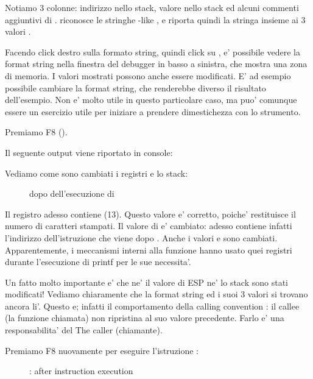 Notiamo 3 colonne: indirizzo nello stack, valore nello stack ed alcuni commenti aggiuntivi di \olly. 
\olly riconosce le stringhe \printf{}-like , e riporta quindi la stringa insieme ai 3 valori .

Facendo click destro sulla formato string, quindi click su ,
e' possibile vedere la format string nella finestra del debugger in basso a sinistra, che mostra una zona di memoria.
I valori mostrati possono anche essere modificati.
E' ad esempio possibile cambiare la format string, che renderebbe diverso il risultato dell'esempio.
Non e' molto utile in questo particolare caso, ma puo' comunque essere un esercizio utile per iniziare a prendere dimestichezza con lo strumento.

\clearpage
Premiamo F8 (\stepover).

Il seguente output viene riportato in console:



Vediamo come sono cambiati i registri e lo stack:

\begin{figure}[H]
\centering
{}
\caption{\olly dopo dell'esecuzione di \printf{}}
\label{fig:printf3_olly_3}
\end{figure}

Il registro \EAX adesso contiene  (13).
Questo valore e' corretto, poiche' \printf restituisce il numero di caratteri stampati. 
Il valore di \EIP e' cambiato: adesso contiene infatti l'indirizzo dell'istruzione che viene dopo .
Anche i valori \ECX e \EDX sono cambiati.
Apparentemente, i meccanismi interni alla funzione \printf hanno usato quei registri durante l'esecuzione di printf per le sue necessita'.

Un fatto molto importante e' che ne' il valore di ESP ne' lo stack sono stati modificati!
Vediamo chiaramente che la format string ed i suoi 3 valori si trovano ancora li'.
Questo e; infatti il comportamento della calling convention : il \gls{callee} (la funzione chiamata) non ripristina
\ESP al suo valore precedente. Farlo e' una responsabilita' del The \gls{caller} (chiamante).

\clearpage
Premiamo F8 nuovamente per eseguire l'istruzione :

\begin{figure}[H]
\centering
{}
\caption{\olly: after  instruction execution}
\label{fig:printf3_olly_4}
\end{figure}

